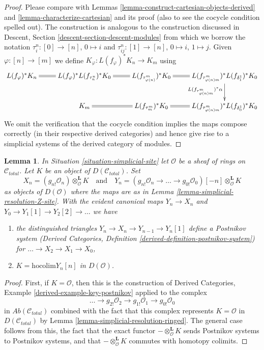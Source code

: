 \documentclass{stacks-project}
\theoremstyle{plain}
\newtheorem{lemma}[subsection]{Lemma}
\theoremstyle{definition}
\theoremstyle{remark}
\numberwithin{equation}{subsection}
\begin{document}
\begin{proof}
Please compare with Lemmas \ref{lemma-construct-cartesian-objects-derived}
and \ref{lemma-characterize-cartesian} and its proof
(also to see the cocycle condition spelled out).
The construction is analogous to the construction discussed in
Descent, Section \ref{descent-section-descent-modules} from which we borrow
the notation $\tau^n_i : [0] \to [n]$, $0 \mapsto i$ and
$\tau^n_{ij} : [1] \to [n]$, $0 \mapsto i$, $1 \mapsto j$.
Given $\varphi : [n] \to [m]$ we define
$K_\varphi : L(f_\varphi)^*K_n \to K_m$
using
$$
\xymatrix{
L(f_\varphi)^*K_n \ar@{=}[r] &
L(f_\varphi)^* L(f_{\tau^n_n})^*K_0 \ar@{=}[r] &
L(f_{\tau^m_{\varphi(n)}})^*K_0 \ar@{=}[r] &
L(f_{\tau^m_{\varphi(n)m}})^* L(f_{\delta^1_1})^*K_0
\ar[d]_{L(f_{\tau^m_{\varphi(n)m}})^*\alpha} \\
&
K_m \ar@{=}[r] &
L(f_{\tau^m_m})^*K_0 \ar@{=}[r] &
L(f_{\tau^m_{\varphi(n)m}})^* L(f_{\delta^1_0})^*K_0
}
$$
We omit the verification that the cocycle condition
implies the maps compose correctly (in their respective
derived categories) and hence give rise to a
simplicial systems of the derived category of modules.
\end{proof}

\begin{lemma}
\label{lemma-modules-postnikov}
In Situation \ref{situation-simplicial-site} let $\mathcal{O}$
be a sheaf of rings on $\mathcal{C}_{total}$. Let $K$ be
an object of $D(\mathcal{C}_{total})$. Set
$$
X_n = (g_{n!}\mathcal{O}_n)
\otimes^\mathbf{L}_\mathcal{O} K
\quad\text{and}\quad
Y_n =
(g_{n!}\mathcal{O}_n \to \ldots \to g_{0!}\mathcal{O}_0)[-n]
\otimes^\mathbf{L}_\mathcal{O} K
$$
as objects of $D(\mathcal{O})$ where the maps are
as in Lemma \ref{lemma-simplicial-resolution-Z-site}.
With the evident canonical maps $Y_n \to X_n$ and
$Y_0 \to Y_1[1] \to Y_2[2] \to \ldots$ we have
\begin{enumerate}
\item the distinguished triangles $Y_n \to X_n \to Y_{n - 1} \to Y_n[1]$
define a Postnikov system
(Derived Categories, Definition \ref{derived-definition-postnikov-system})
for $\ldots \to X_2 \to X_1 \to X_0$,
\item $K = \text{hocolim} Y_n[n]$ in $D(\mathcal{O})$.
\end{enumerate}
\end{lemma}

\begin{proof}
First, if $K = \mathcal{O}$, then this is the construction of
Derived Categories, Example \ref{derived-example-key-postnikov}
applied to the complex
$$
\ldots \to
g_{2!}\mathcal{O}_2 \to
g_{1!}\mathcal{O}_1 \to
g_{0!}\mathcal{O}_0
$$
in $\textit{Ab}(\mathcal{C}_{total})$ combined with the fact that
this complex represents $K = \mathcal{O}$ in $D(\mathcal{C}_{total})$
by Lemma \ref{lemma-simplicial-resolution-ringed}.
The general case follows from this, the fact that the exact functor
$- \otimes^\mathbf{L}_\mathcal{O} K$ sends Postnikov systems to
Postnikov systems, and
that $- \otimes^\mathbf{L}_\mathcal{O} K$ commutes with homotopy colimits.
\end{proof}
\end{document}
